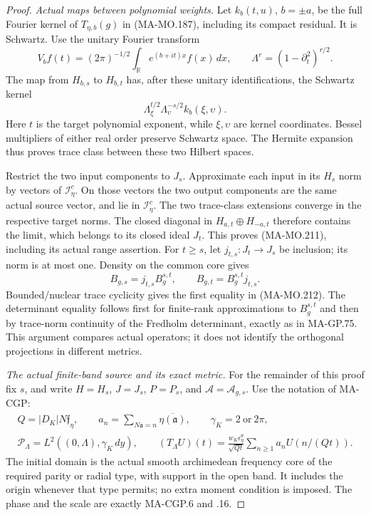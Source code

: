 \begin{proof}
\emph{Actual maps between polynomial weights.}
Let \(k_b(t,u)\), \(b=\pm a\), be the full Fourier kernel of
\(T_{\eta,b}(g)\) in (MA-MO.187), including its compact residual.
It is Schwartz.  Use the unitary Fourier transform
\[
 V_b f(t)=(2\pi)^{-1/2}\int_{\mathbb R}e^{(b+it)x}f(x)\,dx,
 \qquad \Lambda^r=(1-\partial_t^2)^{r/2}.
\]
The map from \(H_{b,s}\) to \(H_{b,t}\) has, after these
unitary identifications, the Schwartz kernel
\[
                  \Lambda_\xi^{t/2}\Lambda_\upsilon^{-s/2}
                                           k_b(\xi,\upsilon).
 \tag{MA-MO.213}
\]
Here \(t\) is the target polynomial exponent, while
\(\xi,\upsilon\) are kernel coordinates.  Bessel multipliers of either real order
preserve Schwartz space.  The Hermite expansion thus proves
trace class between these two Hilbert spaces.

Restrict the two input components to \(J_s\).  Approximate each
input in its \(H_s\) norm by vectors of \(\mathscr I^c_\eta\).
On those vectors the two output components are the same actual
source vector, and lie in \(\mathscr I^c_\eta\).  The two
trace-class extensions converge in the respective target norms.
The closed diagonal in \(H_{a,t}\oplus H_{-a,t}\) therefore
contains the limit, which belongs to its closed ideal \(J_t\).
This proves (MA-MO.211), including its actual range assertion.
For \(t\ge s\), let \(j_{t,s}:J_t\to J_s\) be inclusion;
its norm is at most one.  Density on the common core gives
\[
 B_{g,s}=j_{t,s}B_g^{s,t},\qquad
 B_{g,t}=B_g^{s,t}j_{t,s}.
 \tag{MA-MO.214}
\]
Bounded/nuclear trace cyclicity gives the first equality in
(MA-MO.212).  The determinant equality follows first for
finite-rank approximations to \(B_g^{s,t}\) and then by
trace-norm continuity of the Fredholm determinant, exactly as
in MA-GP.75.  This argument compares actual operators; it does
not identify the orthogonal projections in different metrics.

\emph{The actual finite-band source and its exact metric.}
For the remainder of this proof fix \(s\), and write
\(H=H_s\), \(J=J_s\), \(P=P_s\), and
\(\mathcal A=\mathcal A_{g,s}\).  Use the notation of MA-CGP:
\[
 \begin{gathered}
 Q=|D_K|N\mathfrak f_\eta,\qquad
 a_n=\sum_{N\mathfrak a=n}\overline{\eta(\mathfrak a)},\qquad
 \gamma_K=2\ \text{or}\ 2\pi,\\
 \mathcal P_\Lambda=L^2((0,\Lambda),\gamma_K\,dy),\qquad
 (T_\Lambda U)(t)=
   \frac{w_K\epsilon_\eta^\theta}{\sqrt{Qt}}
                        \sum_{n\ge1}a_nU(n/(Qt)).
 \end{gathered}
 \tag{MA-MO.215}
\]
The initial domain is the actual smooth archimedean frequency
core of the required parity or radial type, with support in the
open band.  It includes the origin whenever that type permits;
no extra moment condition is imposed.  The phase and the scale
are exactly MA-CGP.6 and .16.


\end{proof}
